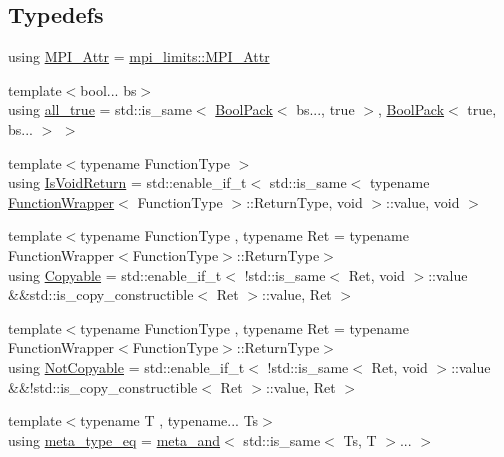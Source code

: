 \subsection*{Typedefs}
\begin{DoxyCompactItemize}
\item 
using \hyperlink{namespacevt_1_1util_acdef825f3bbbffb020925d3ba6151df9}{M\+P\+I\+\_\+\+Attr} = \hyperlink{structvt_1_1util_1_1mpi__limits_1_1_m_p_i___attr}{mpi\+\_\+limits\+::\+M\+P\+I\+\_\+\+Attr}
\item 
{\footnotesize template$<$bool... bs$>$ }\\using \hyperlink{namespacevt_1_1util_a3169b1fa334a1e8fa2326b8db648e446}{all\+\_\+true} = std\+::is\+\_\+same$<$ \hyperlink{structvt_1_1util_1_1_bool_pack}{Bool\+Pack}$<$ bs..., true $>$, \hyperlink{structvt_1_1util_1_1_bool_pack}{Bool\+Pack}$<$ true, bs... $>$ $>$
\item 
{\footnotesize template$<$typename Function\+Type $>$ }\\using \hyperlink{namespacevt_1_1util_a97df3e28837417537b3bc035c74f064d}{Is\+Void\+Return} = std\+::enable\+\_\+if\+\_\+t$<$ std\+::is\+\_\+same$<$ typename \hyperlink{structvt_1_1util_1_1_function_wrapper}{Function\+Wrapper}$<$ Function\+Type $>$\+::Return\+Type, void $>$\+::value, void $>$
\item 
{\footnotesize template$<$typename Function\+Type , typename Ret  = typename Function\+Wrapper$<$\+Function\+Type$>$\+::\+Return\+Type$>$ }\\using \hyperlink{namespacevt_1_1util_ae9a553985cdc8e9bd4e55f55161f2929}{Copyable} = std\+::enable\+\_\+if\+\_\+t$<$ !std\+::is\+\_\+same$<$ Ret, void $>$\+::value \&\&std\+::is\+\_\+copy\+\_\+constructible$<$ Ret $>$\+::value, Ret $>$
\item 
{\footnotesize template$<$typename Function\+Type , typename Ret  = typename Function\+Wrapper$<$\+Function\+Type$>$\+::\+Return\+Type$>$ }\\using \hyperlink{namespacevt_1_1util_a0760a3963341a602dfe2dfc42d78c867}{Not\+Copyable} = std\+::enable\+\_\+if\+\_\+t$<$ !std\+::is\+\_\+same$<$ Ret, void $>$\+::value \&\&!std\+::is\+\_\+copy\+\_\+constructible$<$ Ret $>$\+::value, Ret $>$
\item 
{\footnotesize template$<$typename T , typename... Ts$>$ }\\using \hyperlink{namespacevt_1_1util_aaa76da2983f12be56a31a96c017e8dd1}{meta\+\_\+type\+\_\+eq} = \hyperlink{structvt_1_1util_1_1meta__and}{meta\+\_\+and}$<$ std\+::is\+\_\+same$<$ Ts, T $>$... $>$
\end{DoxyCompactItemize}


